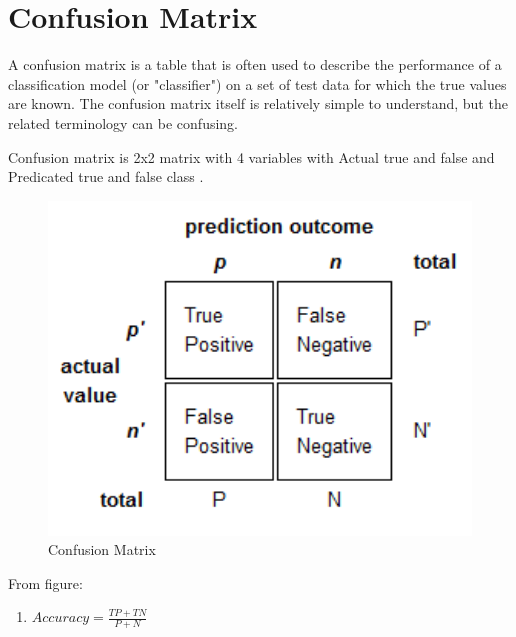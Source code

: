 \section{Confusion Matrix}
A confusion matrix is a table that is often used to describe the performance of a classification model (or "classifier") on a set of test data for which the true values are known. The confusion matrix itself is relatively simple to understand, but the related terminology can be confusing.	
\par 
Confusion matrix is 2x2 matrix with 4 variables with Actual true and false and Predicated true and false class .

\begin{figure}[tbh] %
\begin{large}
	\includegraphics[width=6in]{images/confusionmatrix.png}
	\caption{Confusion Matrix} %
	\label{Confusion matrix} %
\end{large}
\end{figure} 
\par
From figure:
\begin{enumerate}
\item $Accuracy = \frac{TP+TN}{P+N}$
	
\end{enumerate}

 
 

